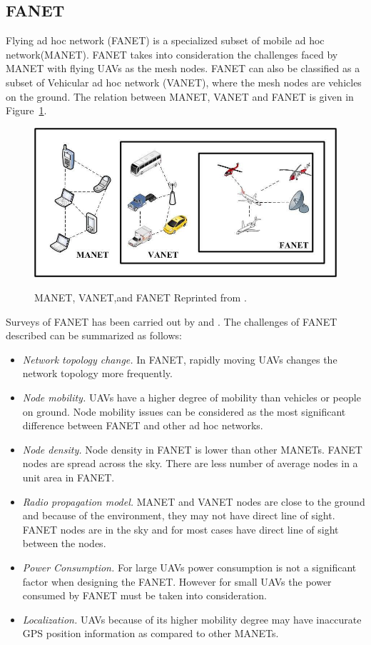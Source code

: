 \subsection{FANET}

Flying ad hoc network (FANET) is a specialized subset of mobile ad hoc network(MANET). FANET takes into consideration the challenges faced by MANET with flying UAVs as the mesh nodes. FANET can also be classified as a subset of Vehicular ad hoc network (VANET), where the mesh nodes are vehicles on the ground. The relation between MANET, VANET and FANET is given in Figure~\ref{fig:manet-vanet-and-fanet}.

\begin{figure}
	\centering
	\caption[MANET, VANET and FANET]{\small 
		MANET, VANET,and FANET Reprinted from . }
	\includegraphics[width=5in]{figures/literature/MANET-VANET-and-FANET}
	\label{fig:manet-vanet-and-fanet}
\end{figure}

Surveys of FANET has been carried out by  and . The challenges of FANET described can be summarized as follows:

\begin{itemize}
	\item \textit{Network topology change.} In FANET, rapidly moving UAVs changes the network topology more frequently.
	\item \textit{Node mobility.} UAVs have a higher degree of mobility than vehicles or people on ground. Node mobility issues can be considered as the most significant difference between FANET and other ad hoc networks.
	\item \textit{Node density.} Node density in FANET is lower than other MANETs. FANET nodes are spread across the sky. There are less number of average nodes in a unit area in FANET. 
	\item \textit{Radio propagation model.} MANET and VANET nodes are close to the ground and because of the environment, they may not have direct line of sight. FANET nodes are in the sky and for most cases have direct line of sight between the nodes.
	\item \textit{Power Consumption.} For large UAVs power consumption is not a significant factor when designing the FANET. However for small UAVs the power consumed by FANET must be taken into consideration.  
	\item \textit{Localization.} UAVs because of its higher mobility degree may have inaccurate GPS position information as compared to other MANETs.	
\end{itemize}

